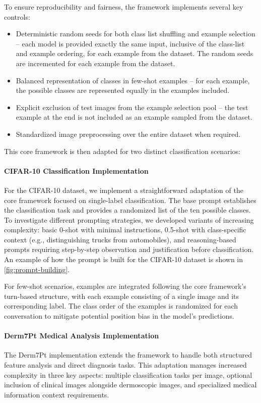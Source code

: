 \documentclass[../ShajiS_RnDReport.tex]{subfiles}
\begin{document}
To ensure reproducibility and fairness, the framework implements several key controls:
\begin{itemize}
    \item Deterministic random seeds for both class list shuffling and example selection -- each model is provided exactly the same input, inclusive of the class-list and example ordering, for each example from the dataset. The random seeds are incremented for each example from the dataset.
    \item Balanced representation of classes in few-shot examples -- for each example, the possible classes are represented equally in the examples included.
    \item Explicit exclusion of test images from the example selection pool -- the test example at the end is not included as an example sampled from the dataset.
    \item Standardized image preprocessing over the entire dataset when required.
\end{itemize}

This core framework is then adapted for two distinct classification scenarios:

\paragraph{CIFAR-10 Classification Implementation}
For the CIFAR-10 dataset, we implement a straightforward adaptation of the core framework focused on single-label classification. The base prompt establishes the classification task and provides a randomized list of the ten possible classes. To investigate different prompting strategies, we developed variants of increasing complexity: basic 0-shot with minimal instructions, 0.5-shot with class-specific context (e.g., distinguishing trucks from automobiles), and reasoning-based prompts requiring step-by-step observation and justification before classification. An example of how the prompt is built for the CIFAR-10 dataset is shown in \autoref{fig:prompt-building}.

For few-shot scenarios, examples are integrated following the core framework's turn-based structure, with each example consisting of a single image and its corresponding label. The class order of the examples is randomized for each conversation to mitigate potential position bias in the model's predictions.

\paragraph{Derm7Pt Medical Analysis Implementation}
The Derm7Pt implementation extends the framework to handle both structured feature analysis and direct diagnosis tasks. This adaptation manages increased complexity in three key aspects: multiple classification tasks per image, optional inclusion of clinical images alongside dermoscopic images, and specialized medical information context requirements.
\end{document}
